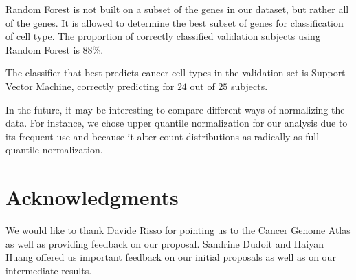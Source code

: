 Random Forest is not built on a subset of the genes in our dataset, but rather all of the genes. It is allowed
to determine the best subset of genes for classification of cell type. The proportion of correctly 
classified validation subjects using Random Forest is $88\%$.

The classifier that best predicts cancer cell types in the validation set is Support Vector Machine, 
correctly predicting for $24$ out of $25$ subjects.

In the future,  it may be interesting to compare different ways of normalizing the data. For instance,
we chose upper quantile normalization for our analysis due to its frequent use and because it alter 
count distributions as radically as full quantile normalization.


\section*{Acknowledgments}

We would like to thank Davide Risso for pointing us to the Cancer Genome Atlas
as well as providing feedback on our proposal. Sandrine Dudoit and Haiyan Huang
offered us important feedback on our initial proposals as well as on our
intermediate results. 




